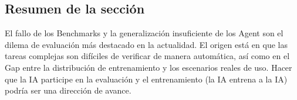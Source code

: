 \subsection{Resumen de la sección}

El fallo de los Benchmarks y la generalización insuficiente de los Agent son el dilema de evaluación más destacado en la actualidad. El origen está en que las tareas complejas son difíciles de verificar de manera automática, así como en el Gap entre la distribución de entrenamiento y los escenarios reales de uso. Hacer que la IA participe en la evaluación y el entrenamiento (la IA entrena a la IA) podría ser una dirección de avance.

